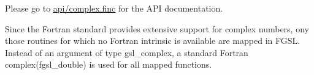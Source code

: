 Please go to \hyperlink{complex_8finc}{api/complex.\+finc} for the A\+P\+I documentation.

Since the Fortran standard provides extensive support for complex numbers, ony those routines for which no Fortran intrinsic is available are mapped in F\+G\+S\+L. Instead of an argument of type {\ttfamily gsl\+\_\+complex}, a standard Fortran {\ttfamily complex(fgsl\+\_\+double)} is used for all mapped functions. 